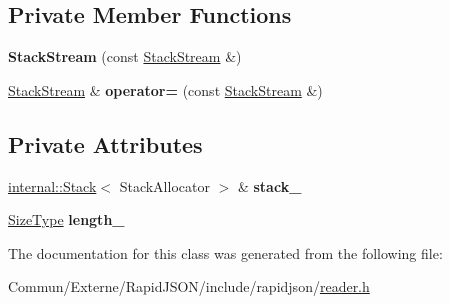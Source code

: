 \subsection*{Private Member Functions}
\begin{DoxyCompactItemize}
\item 
{\bfseries Stack\+Stream} (const \hyperlink{class_generic_reader_1_1_stack_stream}{Stack\+Stream} \&)\hypertarget{class_generic_reader_1_1_stack_stream_a66f42e9a55810bf5bfe1b5c86c09dd51}{}\label{class_generic_reader_1_1_stack_stream_a66f42e9a55810bf5bfe1b5c86c09dd51}

\item 
\hyperlink{class_generic_reader_1_1_stack_stream}{Stack\+Stream} \& {\bfseries operator=} (const \hyperlink{class_generic_reader_1_1_stack_stream}{Stack\+Stream} \&)\hypertarget{class_generic_reader_1_1_stack_stream_af760ba2cf259372ffc9dd4d879cb55ef}{}\label{class_generic_reader_1_1_stack_stream_af760ba2cf259372ffc9dd4d879cb55ef}

\end{DoxyCompactItemize}
\subsection*{Private Attributes}
\begin{DoxyCompactItemize}
\item 
\hyperlink{classinternal_1_1_stack}{internal\+::\+Stack}$<$ Stack\+Allocator $>$ \& {\bfseries stack\+\_\+}\hypertarget{class_generic_reader_1_1_stack_stream_a175494011b48c130d092129fae81bcc8}{}\label{class_generic_reader_1_1_stack_stream_a175494011b48c130d092129fae81bcc8}

\item 
\hyperlink{rapidjson_8h_a5ed6e6e67250fadbd041127e6386dcb5}{Size\+Type} {\bfseries length\+\_\+}\hypertarget{class_generic_reader_1_1_stack_stream_a9a3711b7b92f4ff85e210c2d59163ff1}{}\label{class_generic_reader_1_1_stack_stream_a9a3711b7b92f4ff85e210c2d59163ff1}

\end{DoxyCompactItemize}


The documentation for this class was generated from the following file\+:\begin{DoxyCompactItemize}
\item 
Commun/\+Externe/\+Rapid\+J\+S\+O\+N/include/rapidjson/\hyperlink{reader_8h}{reader.\+h}\end{DoxyCompactItemize}
